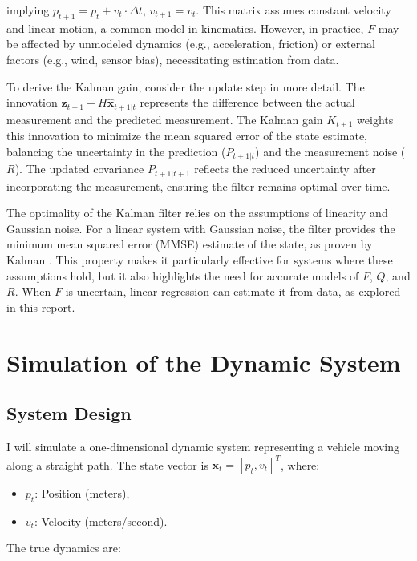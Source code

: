 \documentclass[12pt]{article}
\begin{document}
implying \( p_{t+1} = p_t + v_t \cdot \Delta t \), \( v_{t+1} = v_t \). This matrix assumes constant velocity and linear motion, a common model in kinematics. However, in practice, \( F \) may be affected by unmodeled dynamics (e.g., acceleration, friction) or external factors (e.g., wind, sensor bias), necessitating estimation from data.

To derive the Kalman gain, consider the update step in more detail. The innovation \( \mathbf{z}_{t+1} - H \hat{\mathbf{x}}_{t+1|t} \) represents the difference between the actual measurement and the predicted measurement. The Kalman gain \( K_{t+1} \) weights this innovation to minimize the mean squared error of the state estimate, balancing the uncertainty in the prediction (\( P_{t+1|t} \)) and the measurement noise (\( R \)). The updated covariance \( P_{t+1|t+1} \) reflects the reduced uncertainty after incorporating the measurement, ensuring the filter remains optimal over time.

The optimality of the Kalman filter relies on the assumptions of linearity and Gaussian noise. For a linear system with Gaussian noise, the filter provides the minimum mean squared error (MMSE) estimate of the state, as proven by Kalman \cite{kalman1960}. This property makes it particularly effective for systems where these assumptions hold, but it also highlights the need for accurate models of \( F \), \( Q \), and \( R \). When \( F \) is uncertain, linear regression can estimate it from data, as explored in this report.

\section{Simulation of the Dynamic System}
\label{sec:simulation}

\subsection{System Design}
\label{subsec:system_design}

I will simulate a one-dimensional dynamic system representing a vehicle moving along a straight path. The state vector is \( \mathbf{x}_t = [p_t, v_t]^T \), where:
\begin{itemize}
    \item \( p_t \): Position (meters),
    \item \( v_t \): Velocity (meters/second).
\end{itemize}

The true dynamics are:
\end{document}
